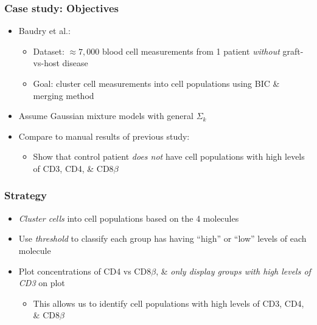 \documentclass[mathserif,compress]{beamer}
\renewcommand\;{\,}
\begin{document}
\begin{frame}\frametitle{Case study: Objectives}
\begin{itemize}

\item[]
Baudry et al.:
\medskip
\begin{itemize}
\item
\alert{Dataset:}
 $\approx 7,000$ blood cell measurements from 1 patient \emph{without} graft-vs-host disease
 \bigskip
 \item
\alert{Goal:} cluster cell measurements into cell populations using BIC \& merging method

\end{itemize}
\bigskip
\item[]
Assume Gaussian mixture models with general $\Sigma_k$
\bigskip
\item[]
Compare to manual results of previous study:
\bigskip
\begin{itemize}
\item
Show that control patient \emph{does not} have cell populations with high levels of CD3, CD4, \& CD8$\beta$
\end{itemize}
\end{itemize}
\end{frame}

\begin{frame}\frametitle{Strategy}
\begin{itemize}
\item
\emph{Cluster cells} into cell populations based on the 4 molecules
\bigskip
\item
Use \emph{threshold} to classify each group has having ``high'' or ``low'' levels of each molecule
\bigskip
\item
Plot concentrations of CD4 vs CD8$\beta$, \& \emph{only display groups with high levels of CD3} on plot
\begin{itemize}
\bigskip
\item
This allows us to identify cell populations with high levels of CD3, CD4, \& CD8$\beta$
\end{itemize}
\end{itemize}
\end{frame}
\end{document}
